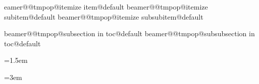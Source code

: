 
\makeatletter
\expandafter\let\csname beamer@@tmpop@itemize item@default\endcsname\relax
\expandafter\let\csname beamer@@tmpop@itemize subitem@default\endcsname\relax
\expandafter\let\csname beamer@@tmpop@itemize subsubitem@default\endcsname\relax


\patchcmd{\@listi}{\leftmargin}{\rightmargin}{}{}
\let\@listI\@listi
\patchcmd{\@listii}{\leftmargin}{\rightmargin}{}{}
\patchcmd{\@listiii}{\leftmargin}{\rightmargin}{}{}
\patchcmd{\beamer@enum@}{\raggedright}{\raggedleft}{}{}
\patchcmd{\@@description}{\raggedright}{\raggedleft}{}{}
\patchcmd{\@@description}{\leftmargin}{\rightmargin}{}{}

\renewcommand{\itemize}[1][]{
  \beamer@ifempty{#1}{}{\def\beamer@defaultospec{#1}}
  \ifnum \@itemdepth >2\relax\@toodeep\else
    \advance\@itemdepth\@ne
    \beamer@computepref\@itemdepth%
    \usebeamerfont{itemize/enumerate \beameritemnestingprefix body}%
    \usebeamercolor[fg]{itemize/enumerate \beameritemnestingprefix body}%
    \usebeamertemplate{itemize/enumerate \beameritemnestingprefix body begin}%
    \list{\usebeamertemplate{itemize \beameritemnestingprefix item}}{\def\makelabel##1{{
      \hss\llap{{
        \usebeamerfont*{itemize \beameritemnestingprefix item}
        \usebeamercolor[fg]{itemize \beameritemnestingprefix item}##1}}
      }}
    }
  \fi
  \beamer@cramped
  \raggedleft
  \beamer@firstlineitemizeunskip
}
\expandafter\let\csname beamer@@tmpop@subsection in toc@default\endcsname\relax
\expandafter\let\csname beamer@@tmpop@subsubsection in toc@default\endcsname\relax
{}
{\leavevmode\rightskip=1.5em\inserttocsubsection\par}

{\leavevmode\normalsize{}\rightskip=3em
  \inserttocsubsubsection\par}
\makeatother

\raggedleft %
